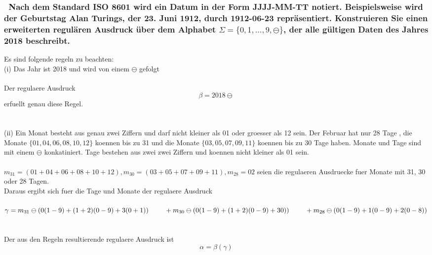 \documentclass{article}
\newcommand{\tab}{\null\ \qquad}
\newcommand{\gap}{\null\ \\ \\}
\begin{document}
\subsubsection{\
    Nach dem Standard ISO 8601 wird ein Datum in der Form JJJJ-MM-TT notiert.
        Beispielsweise wird der Geburtstag Alan Turings, der 23. Juni 1912, 
        durch 1912-06-23 repräsentiert. Konstruieren Sie einen erweiterten 
        regulären Ausdruck über dem Alphabet $\Sigma = \{0,1,...,9, \ominus\}$,
        der alle gültigen Daten des Jahres 2018 beschreibt.
    }
Es sind folgende regeln zu beachten:\\
(i) Das Jahr ist 2018 und wird von einem $\ominus$ gefolgt\\
\\
Der regulaere Ausdruck\[
    \beta = 2018 \ominus
    \]
erfuellt genau diese Regel.\\
\gap
(ii) Ein Monat besteht aus genau zwei Ziffern und darf nicht kleiner als 01 oder
    groesser als 12 sein. Der Februar hat nur 28 Tage
    , die Monate $\{01,04,06,08,10,12\}$ koennen bis zu 31 
    und die Monate $\{03,05,07,09,11\}$ koennen bis zu 30 Tage haben.
    Monate und Tage sind mit einem $\ominus$ konkatiniert.
    Tage bestehen aus zwei zwei Ziffern und koennen nicht kleiner als 01 sein.\\
\\
$m_{31} = (01+04+06+08+10+12), m_{30} = (03+05+07+09+11), m_{28} = 02$ seien die
    regulaeren Ausdruecke fuer Monate mit 31, 30 oder 28 Tagen.\\
Daraus ergibt sich fuer die Tage und Monate der regulaere Ausdruck\\
\\
$\gamma = m_{31} \ominus (0(1-9)+(1+2)(0-9)+3(0+1))\\
    \tab + m_{30} \ominus (0(1-9)+(1+2)(0-9)+30))\\
    \tab + m_{28} \ominus (0(1-9)+1(0-9)+2(0-8))
    $\\
\gap
Der aus den Regeln resultierende regulaere Ausdruck ist\[
    \alpha = \beta (\gamma)
    \]
\end{document}
